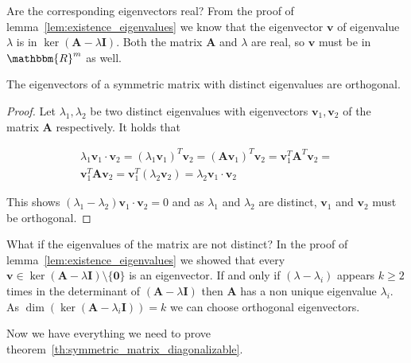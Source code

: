 Are the corresponding eigenvectors real? From the proof of lemma~\ref{lem:existence_eigenvalues} we know that the eigenvector $\mathbf{v}$ of eigenvalue $\lambda$ is in $\ker(\mathbf{A} - \lambda\mathbf{I})$. Both the matrix $\mathbf{A}$ and $\lambda$ are real, so $\mathbf{v}$ must be in $\mathbbm{R}^m$ as well.

\begin{lemma}
	\label{lem:symmetric_matrix_eigenvector_orthogonal}
	The eigenvectors of a symmetric matrix with distinct eigenvalues are orthogonal.
\end{lemma}

\begin{proof}
	Let $\lambda_1, \lambda_2$ be two distinct eigenvalues with eigenvectors $\mathbf{v}_1, \mathbf{v}_2$ of the matrix $\mathbf{A}$ respectively. It holds that
	
	\begin{align*}
		\lambda_1 \mathbf{v}_1 \cdot \mathbf{v}_2 = (\lambda_1\mathbf{v}_1)^T \mathbf{v}_2 = (\mathbf{Av}_1)^T \mathbf{v}_2 = \mathbf{v}_1^T \mathbf{A}^T \mathbf{v}_2 =\\
		\mathbf{v}_1^T \mathbf{A} \mathbf{v}_2 = \mathbf{v}_1^T (\lambda_2 \mathbf{v}_2) = \lambda_2 \mathbf{v}_1 \cdot \mathbf{v}_2
	\end{align*}
	
	This shows $(\lambda_1 - \lambda_2) \mathbf{v}_1 \cdot \mathbf{v}_2 = 0$ and as $\lambda_1$ and $\lambda_2$ are distinct, $\mathbf{v}_1$ and $\mathbf{v}_2$ must be orthogonal.
\end{proof}

What if the eigenvalues of the matrix are not distinct? In the proof of lemma~\ref{lem:existence_eigenvalues} we showed that every $\mathbf{v} \in \ker(\mathbf{A} - \lambda\mathbf{I}) \setminus \{\mathbf{0}\}$ is an eigenvector. If and only if $(\lambda - \lambda_i)$ appears $k \geq 2$ times in the determinant of $(\mathbf{A} - \lambda\mathbf{I})$ then $\mathbf{A}$ has a non unique eigenvalue $\lambda_i$. As ${\dim(\ker(\mathbf{A} - \lambda_i\mathbf{I})) = k}$ we can choose orthogonal eigenvectors. 


Now we have everything we need to prove theorem~\ref{th:symmetric_matrix_diagonalizable}. 

